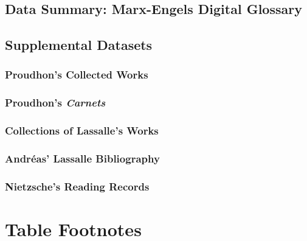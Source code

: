

\subsection{Data Summary: Marx-Engels Digital Glossary\label{app:marxgloss}}



\subsection{Supplemental Datasets\label{app:suppdata}}

\subsubsection{Proudhon's Collected Works\label{app:proudhoncw}}



\subsubsection{Proudhon's \textit{Carnets}\label{app:proudhoncarnets}}



\subsubsection{Collections of Lassalle's Works\label{app:lassallecw}}



\subsubsection{Andréas' Lassalle Bibliography\label{app:lassallebib}}



\subsubsection{Nietzsche's Reading Records\label{app:nietzsche}}




\section{Table Footnotes\label{app:tablefn}}


